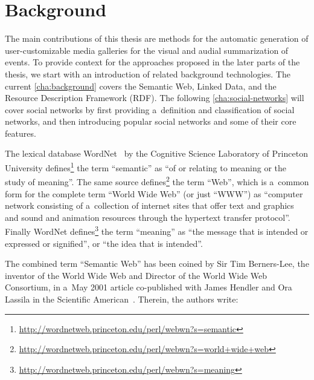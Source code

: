 

\chapter{Background} \label{cha:background}

\ifpdf
    \graphicspath{{2_background/figures/PNG/}{2_background/figures/PDF/}{2_background/figures/}}
\else
    \graphicspath{{2_background/figures/EPS/}{2_background/figures/}}
\fi


The main contributions of this thesis are methods for the automatic generation of
user-customizable media galleries for the visual and audial summarization of events.
To provide context for the approaches proposed in the later parts of the thesis,
we start with an introduction of related background technologies.
The current \autoref{cha:background} covers the Semantic Web, Linked Data,
and the Resource Description Framework (RDF).
The following \autoref{cha:social-networks} will cover social networks
by first providing a~definition and classification of social networks,
and then introducing popular social networks and some of their core features.

The lexical database WordNet~\cite{Fellbaum1998} by the Cognitive Science Laboratory
of Princeton University defines\footnote{\url{http://wordnetweb.princeton.edu/perl/webwn?s=semantic}}
the term ``semantic'' as ``of or relating to meaning or the study of meaning''.
The same source defines\footnote{\url{http://wordnetweb.princeton.edu/perl/webwn?s=world+wide+web}}
the term ``Web'', which is a~common form for the complete term ``World Wide Web'' (or just ``WWW'') as
``computer network consisting of a~collection of internet sites that offer text and graphics and
sound and animation resources through the hypertext transfer protocol''.
Finally WordNet defines\footnote{\url{http://wordnetweb.princeton.edu/perl/webwn?s=meaning}}
the term ``meaning'' as ``the message that is intended or expressed or signified'', or
``the idea that is intended''.

The combined term ``Semantic Web'' has been coined by Sir Tim Berners-Lee,
the inventor of the World Wide Web and Director of the World Wide Web Consortium,
in a~May 2001 article co-published with James Hendler and Ora Lassila
in the Scientific American~\cite{BernersLee2001}.
Therein, the authors write: 

